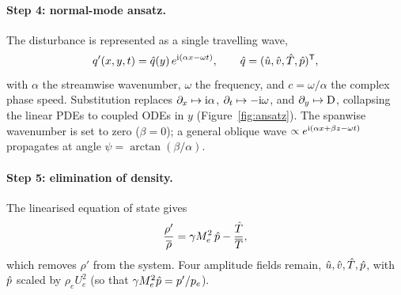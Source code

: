\documentclass[11pt]{article}
\begin{document}
\paragraph{Step 4: normal-mode ansatz.} The disturbance is represented as a single travelling wave,
\begin{equation}\label{eq:ansatz}
  q'(x,y,t)=\hat{q}(y)\,e^{\mathrm{i}(\alpha x-\omega t)},\qquad \hat{q}=(\hat{u},\hat{v},\hat{T},\hat{p})^{\mathsf T},
\end{equation}
with $\alpha$ the streamwise wavenumber, $\omega$ the frequency, and $c=\omega/\alpha$ the complex phase
speed. Substitution replaces $\partial_x\mapsto\mathrm{i}\alpha$, $\partial_t\mapsto-\mathrm{i}\omega$, and
$\partial_y\mapsto\mathrm{D}$, collapsing the linear PDEs to coupled ODEs in $y$
(Figure~\ref{fig:ansatz}). The spanwise wavenumber is set to zero ($\beta=0$); a general oblique wave
$\propto e^{\mathrm{i}(\alpha x+\beta z-\omega t)}$ propagates at angle $\psi=\arctan(\beta/\alpha)$.

\paragraph{Step 5: elimination of density.} The linearised equation of state gives
\begin{equation}\label{eq:state-lin}
  \frac{\rho'}{\overline{\rho}}=\gamma M_e^2\,\hat{p}-\frac{\hat{T}}{\overline{T}},
\end{equation}
which removes $\rho'$ from the system. Four amplitude fields remain, $\hat{u},\hat{v},\hat{T},\hat{p}$, with
$\hat{p}$ scaled by $\rho_eU_e^2$ (so that $\gamma M_e^2\hat{p}=p'/p_e$).
\end{document}
